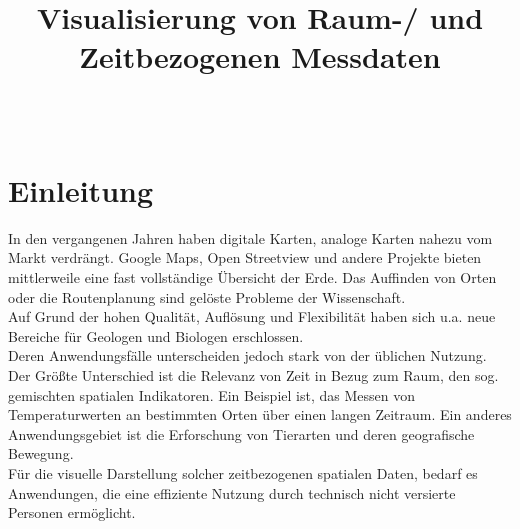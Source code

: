 \documentclass[10pt,conference,compsocconf]{IEEEtran}
\begin{document}
%
\title{\textbf{\Large Visualisierung von Raum-/ und Zeitbezogenen Messdaten}\\[0.2ex]}

\author{
\\
}

\maketitle

\IEEEpeerreviewmaketitle


\section{Einleitung}
In den vergangenen Jahren haben digitale Karten, analoge Karten nahezu vom Markt verdrängt. Google Maps, Open Streetview und andere Projekte bieten mittlerweile eine fast vollständige Übersicht der Erde. Das Auffinden von Orten oder die Routenplanung sind gelöste Probleme der Wissenschaft.\\
Auf Grund der hohen Qualität, Auflösung und Flexibilität haben sich u.a. neue Bereiche für Geologen und Biologen erschlossen.\\
Deren Anwendungsfälle unterscheiden jedoch stark von der üblichen Nutzung. Der Größte Unterschied ist die Relevanz von Zeit in Bezug zum Raum, den sog. gemischten spatialen Indikatoren. Ein Beispiel ist, das Messen von Temperaturwerten an bestimmten Orten über einen langen Zeitraum. Ein anderes Anwendungsgebiet ist die Erforschung von Tierarten und deren geografische Bewegung.\\
Für die visuelle Darstellung solcher zeitbezogenen spatialen Daten, bedarf es Anwendungen, die eine effiziente Nutzung durch technisch nicht versierte Personen ermöglicht.
\end{document}
